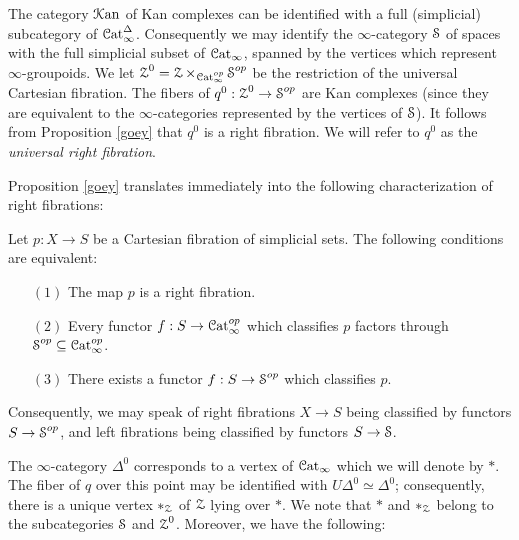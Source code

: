 The category $\operatorname{\mathcal{K}an}$ of Kan complexes can be identified with a full (simplicial) subcategory of $\operatorname{\mathcal{C}at}_{\infty}^{\Delta}$. Consequently we may identify the $\infty$-category
$\operatorname{\mathcal{S}}$ of spaces with the full simplicial subset of $\operatorname{\mathcal{C}at}_{\infty}$, spanned by the vertices which represent $\infty$-groupoids. We let $\operatorname{\mathcal{Z}}^0 = \operatorname{\mathcal{Z}} \times_{ \operatorname{\mathcal{C}at}_{\infty}^{op}} \operatorname{\mathcal{S}}^{op}$ be the restriction of the universal Cartesian fibration. The fibers of $q^0: \operatorname{\mathcal{Z}}^0 \rightarrow \operatorname{\mathcal{S}}^{op}$
are Kan complexes (since they are equivalent to the $\infty$-categories represented by the vertices of $\operatorname{\mathcal{S}}$). It follows from Proposition \ref{goey} that $q^0$ is a right fibration. We will refer to
$q^0$ as the {\it universal right fibration}.

Proposition \ref{goey} translates immediately into the following characterization of right fibrations:

\begin{proposition}
Let $p: X \rightarrow S$ be a Cartesian fibration of simplicial sets. The following conditions are equivalent:
\begin{itemize}
\item[$(1)$] The map $p$ is a right fibration.
\item[$(2)$] Every functor $f: S \rightarrow \operatorname{\mathcal{C}at}_{\infty}^{op}$ which classifies $p$ factors
through $\operatorname{\mathcal{S}}^{op} \subseteq \operatorname{\mathcal{C}at}_{\infty}^{op}$.
\item[$(3)$] There exists a functor $f: S \rightarrow \operatorname{\mathcal{S}}^{op}$ which classifies $p$.
\end{itemize}
\end{proposition}

Consequently, we may speak of right fibrations $X \rightarrow S$ being classified by functors
$S \rightarrow \operatorname{\mathcal{S}}^{op}$, and left fibrations being classified by functors $S \rightarrow \operatorname{\mathcal{S}}$.

The $\infty$-category $\Delta^0$ corresponds to a vertex of $\operatorname{\mathcal{C}at}_{\infty}$ which we will denote by $\ast$. The fiber of $q$ over this point may be identified with $U \Delta^0 \simeq \Delta^0$; consequently, there is a unique vertex $\ast_{\operatorname{\mathcal{Z}}}$ of $\operatorname{\mathcal{Z}}$ lying over $\ast$. 
We note that $\ast$ and $\ast_{\operatorname{\mathcal{Z}}}$ belong to the subcategories $\operatorname{\mathcal{S}}$ and $\operatorname{\mathcal{Z}}^0$. Moreover, we have the following:

